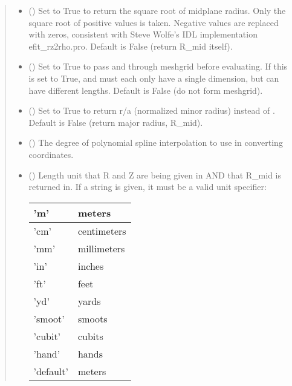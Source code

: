 \documentclass[letterpaper,10pt,english]{sphinxmanual}
\begin{document}
\begin{fulllineitems}
\begin{fulllineitems}
\begin{quote}
\begin{description}
\begin{itemize}
\item {} 
 () \textendash{} Set to True to return the square root of midplane
radius. Only the square root of positive values is taken.
Negative values are replaced with zeros, consistent with Steve
Wolfe’s IDL implementation efit\_rz2rho.pro. Default is False
(return R\_mid itself).

\item {} 
 () \textendash{} Set to True to pass  and  through
meshgrid before evaluating. If this is set to True,  and 
must each only have a single dimension, but can have different
lengths.  Default is False (do not form meshgrid).

\item {} 
 () \textendash{} Set to True to return r/a (normalized minor radius)
instead of . Default is False (return major radius,
R\_mid).

\item {} 
 () \textendash{} The degree of polynomial spline interpolation to
use in converting coordinates.

\item {} 
 () \textendash{} 
Length unit that R and Z are being given
in AND that R\_mid is returned in. If a string is given, it
must be a valid unit specifier:


\begin{savenotes}\sphinxattablestart
\centering
\begin{tabulary}{\linewidth}[t]{|T|T|}
\hline

’m’
&
meters
\\
\hline
’cm’
&
centimeters
\\
\hline
’mm’
&
millimeters
\\
\hline
’in’
&
inches
\\
\hline
’ft’
&
feet
\\
\hline
’yd’
&
yards
\\
\hline
’smoot’
&
smoots
\\
\hline
’cubit’
&
cubits
\\
\hline
’hand’
&
hands
\\
\hline
’default’
&
meters
\\
\hline
\end{tabulary}
\par
\sphinxattableend\end{savenotes}


\end{itemize}
\end{description}
\end{quote}
\end{fulllineitems}
\end{fulllineitems}
\end{document}
